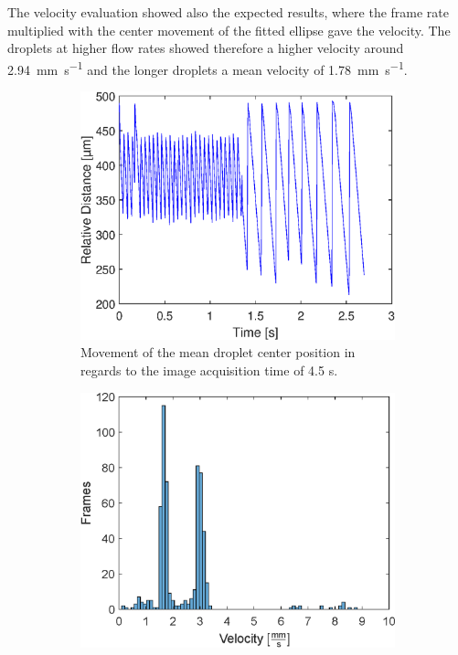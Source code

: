The velocity evaluation showed also the expected results, where the frame rate multiplied with the center movement of the fitted ellipse gave the velocity. The droplets at higher flow rates showed therefore a higher velocity around \SI{2.94}{\mm\per\second} and the longer droplets a mean velocity of \SI{1.78}{\mm\per\second}. 
\begin{figure}
	\begin{subfigure}[l]{0.49\textwidth} 
	\centering
	\includegraphics[clip,trim={0mm 0mm 0mm 0mm}, scale=.5]{Ressourcen/Tracking/LocationDropletCenter}
	\caption{Movement of the mean droplet center position in regards to the image acquisition time of 4.5 s.}
	\label{fig:tracking:center}
\end{subfigure}
\hfill
\begin{subfigure}[r]{0.49\textwidth} 
	\centering
	\includegraphics[clip,trim={0mm .5mm 0mm 0mm},scale=.49]{Ressourcen/Tracking/Velocity}

\end{subfigure}
\end{figure}
